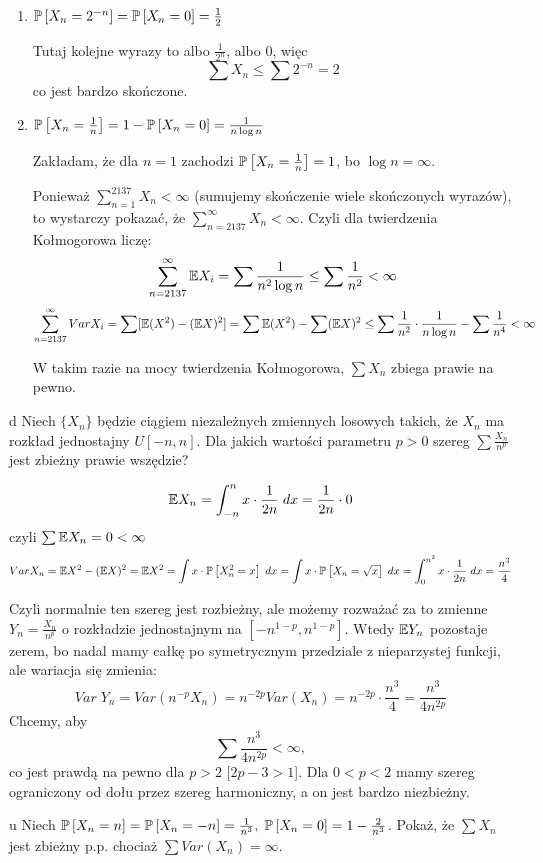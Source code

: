 \documentclass{article}
\begin{document}
\begin{enumerate}[label=(\alph*)]
  \item $\prob{X_n=2^{-n}}=\prob{X_n=0}=\frac12$

      Tutaj kolejne wyrazy to albo $\frac{1}{2^n}$, albo $0$, więc
      $$\sum X_n\leq\sum2^{-n}=2$$
      co jest bardzo skończone.

  \item $\prob{X_n=\frac{1}{n}}=1-\prob{X_n=0}=\frac{1}{n\log n}$

    Zakładam, że dla $n=1$ zachodzi $\prob{X_n=\frac{1}{n}}=1$, bo $\log n=\infty$.

    Ponieważ $\sum_{n=1}^{2137}X_n<\infty$ (sumujemy skończenie wiele skończonych wyrazów), to wystarczy pokazać, że $\sum_{n=2137}^\infty X_n<\infty$. Czyli dla twierdzenia Kołmogorowa liczę:
    $$\sum_{n=2137}^\infty\mathbb{E} X_i=\sum \frac{1}{n^2\log n}\leq\sum\frac{1}{n^2}<\infty$$
    $$\sum_{n=2137}^\infty Var X_i=\sum[\mathbb{E}(X^2)-(\mathbb{E} X)^2]=\sum\mathbb{E}(X^2)-\sum(\mathbb{E} X)^2\leq \sum \frac{1}{n^2}\cdot\frac{1}{n\log n}-\sum\frac{1}{n^4}<\infty$$

    W takim razie na mocy twierdzenia Kołmogorowa, $\sum X_n$ zbiega prawie na pewno.
\end{enumerate}

\begin{problem}[6]{d}
  Niech $\{X_n\}$ będzie ciągiem niezależnych zmiennych losowych takich, że $X_n$ ma rozkład jednostajny $U[-n,n]$. Dla jakich wartości parametru $p>0$ szereg $\sum\frac{X_n}{n^p}$ jest zbieżny prawie wszędzie?
\end{problem}

$$\mathbb{E} X_n=\int_{-n}^n x\cdot \frac{1}{2n}\;dx=\frac{1}{2n}\cdot 0$$
czyli $\sum \mathbb{E} X_n=0<\infty$
$$Var X_n=\e X^2-(\e X)^2=\e X^2=\int x\cdot\prob{X_n^2=x}\;dx=\int x\cdot\prob{X_n=\sqrt{x}}\;dx=\int_0^{n^2}x\cdot\frac{1}{2n}\;dx=\frac{n^3}{4}$$

Czyli normalnie ten szereg jest rozbieżny, ale możemy rozważać za to zmienne $Y_n=\frac{X_n}{n^p}$ o rozkładzie jednostajnym na $[-n^{1-p},n^{1-p}]$. Wtedy $\mathbb{E} Y_n$ pozostaje zerem, bo nadal mamy całkę po symetrycznym przedziale z nieparzystej funkcji, ale wariacja się zmienia:
$$Var\; Y_n=Var(n^{-p}X_n)=n^{-2p}Var(X_n)=n^{-2p}\cdot \frac{n^3}{4}=\frac{n^3}{4n^{2p}}$$
Chcemy, aby
$$\sum \frac{n^3}{4n^{2p}}<\infty,$$
co jest prawdą na pewno dla $p>2$ [$2p-3>1$]. Dla $0<p<2$ mamy szereg ograniczony od dołu przez szereg harmoniczny, a on jest bardzo niezbieżny.

\begin{problem}[7]{u}
  Niech $\prob{X_n=n}=\prob{X_n=-n}=\frac{1}{n^3},\;\prob{X_n=0}=1-\frac{2}{n^3}$. Pokaż, że $\sum X_n$ jest zbieżny p.p. chociaż $\sum Var(X_n)=\infty$.
\end{problem}
\end{document}
